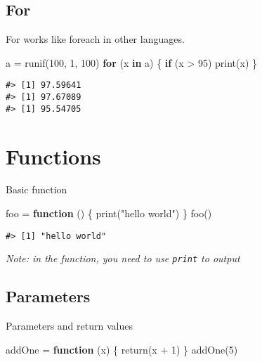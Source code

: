 \documentclass[
]{book}
\newenvironment{Shaded}{\begin{snugshade}}{\end{snugshade}}
\newcommand{\ControlFlowTok}[1]{\textcolor[rgb]{0.13,0.29,0.53}{\textbf{#1}}}
\newcommand{\DecValTok}[1]{\textcolor[rgb]{0.00,0.00,0.81}{#1}}
\newcommand{\FunctionTok}[1]{\textcolor[rgb]{0.00,0.00,0.00}{#1}}
\newcommand{\NormalTok}[1]{#1}
\newcommand{\OtherTok}[1]{\textcolor[rgb]{0.56,0.35,0.01}{#1}}
\newcommand{\SpecialCharTok}[1]{\textcolor[rgb]{0.00,0.00,0.00}{#1}}
\newcommand{\StringTok}[1]{\textcolor[rgb]{0.31,0.60,0.02}{#1}}
\begin{document}
\hypertarget{for}{%
\section{For}\label{for}}

For works like foreach in other languages.

\begin{Shaded}
\begin{Highlighting}[]
\NormalTok{a }\OtherTok{=} \FunctionTok{runif}\NormalTok{(}\DecValTok{100}\NormalTok{, }\DecValTok{1}\NormalTok{, }\DecValTok{100}\NormalTok{)}
\ControlFlowTok{for}\NormalTok{ (x }\ControlFlowTok{in}\NormalTok{ a) \{}
  \ControlFlowTok{if}\NormalTok{ (x }\SpecialCharTok{\textgreater{}} \DecValTok{95}\NormalTok{)}
    \FunctionTok{print}\NormalTok{(x)}
\NormalTok{\}}
\end{Highlighting}
\end{Shaded}

\begin{verbatim}
#> [1] 97.59641
#> [1] 97.67089
#> [1] 95.54705
\end{verbatim}

\hypertarget{functions}{%
\chapter{Functions}\label{functions}}

Basic function

\begin{Shaded}
\begin{Highlighting}[]
\NormalTok{foo }\OtherTok{=} \ControlFlowTok{function}\NormalTok{ () \{}
  \FunctionTok{print}\NormalTok{(}\StringTok{"hello world"}\NormalTok{)}
\NormalTok{\}}
\FunctionTok{foo}\NormalTok{()}
\end{Highlighting}
\end{Shaded}

\begin{verbatim}
#> [1] "hello world"
\end{verbatim}

\emph{Note: in the function, you need to use \texttt{print} to output}

\hypertarget{parameters}{%
\section{Parameters}\label{parameters}}

Parameters and return values

\begin{Shaded}
\begin{Highlighting}[]
\NormalTok{addOne }\OtherTok{=} \ControlFlowTok{function}\NormalTok{ (x) \{}
  \FunctionTok{return}\NormalTok{(x }\SpecialCharTok{+} \DecValTok{1}\NormalTok{)}
\NormalTok{\}}
\FunctionTok{addOne}\NormalTok{(}\DecValTok{5}\NormalTok{)}
\end{Highlighting}
\end{Shaded}
\end{document}
